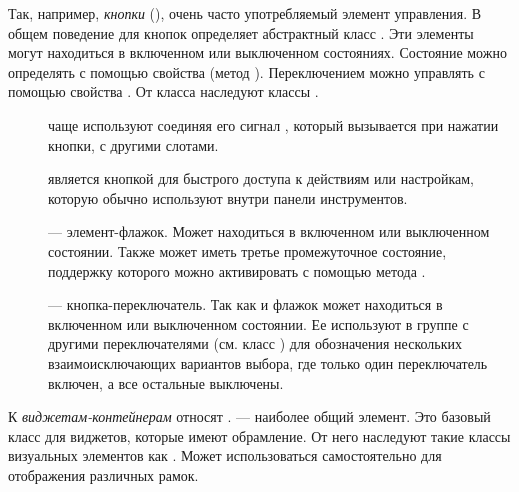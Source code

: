 Так, например, \emph{кнопки} (), очень часто употребляемый элемент управления. В общем поведение для кнопок
определяет абстрактный класс . Эти элементы могут находиться в включенном
или выключенном состояниях. Состояние можно определять с помощью свойства  (метод ). Переключением
можно управлять с помощью свойства  .
 От класса  
наследуют классы  .

\begin{description}
\item[] чаще используют соединяя его сигнал  , который вызывается
при нажатии кнопки, с другими слотами. 
\item[] является кнопкой для быстрого доступа к действиям или настройкам, которую обычно используют внутри панели инструментов.
\item[] --- элемент-флажок. Может находиться в включенном или выключенном
состоянии. Также может иметь третье промежуточное состояние, поддержку которого можно активировать с помощью метода
 .
\item[] --- кнопка-переключатель. Так как и флажок может находиться в включенном или выключенном
состоянии. Ее используют в группе с другими переключателями (см. класс  ) для обозначения нескольких
взаимоисключающих вариантов выбора, где только один переключатель включен, а все остальные выключены. 
\end{description}

К \emph{виджетам-контейнерам}  относят  .  --- наиболее общий элемент. Это базовый класс для виджетов, которые имеют
обрамление. От него наследуют такие классы визуальных элементов как  . Может использоваться самостоятельно для отображения различных рамок.

